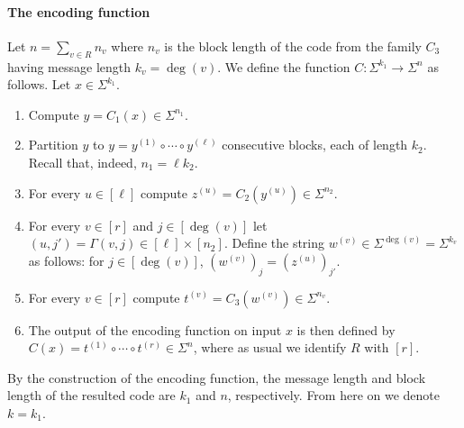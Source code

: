 \paragraph{The encoding function}
Let $n=\sum_{v\in R}n_v$ where $n_v$ is the block length of the code from the family $C_3$ having message length $k_v=\deg(v)$. We define the function $C:\Sigma^{k_1}\to\Sigma^n$ as follows. Let $x\in\Sigma^{k_1}$.
\begin{enumerate}
\item Compute $y=C_1(x)\in\Sigma^{n_1}$.
\item Partition $y$ to $y=y^{(1)}\circ\cdots\circ y^{(\ell)}$ consecutive blocks, each of length $k_2$. Recall that, indeed, $n_1=\ell k_2$.
\item For every $u\in[\ell]$ compute $z^{(u)}=C_2(y^{(u)})\in\Sigma^{n_2}$.
\item For every $v\in[r]$ and $j\in[\deg(v)]$ let $(u,j')=\Gamma(v,j)\in[\ell]\times[n_2]$. Define the string $w^{(v)}\in\Sigma^{\deg(v)}=\Sigma^{k_v}$ as follows: for $j\in[\deg(v)]$, $(w^{(v)})_j=(z^{(u)})_{j'}$.
\item For every $v\in[r]$ compute $t^{(v)}=C_3(w^{(v)})\in\Sigma^{n_v}$.
\item The output of the encoding function on input $x$ is then defined by $C(x)=t^{(1)}\circ\cdots\circ t^{(r)}\in\Sigma^n$, where as usual we identify $R$ with $[r]$.
\end{enumerate}
By the construction of the encoding function, the message length and block length of the resulted code are $k_1$ and $n$, respectively. From here on we denote $k=k_1$.
